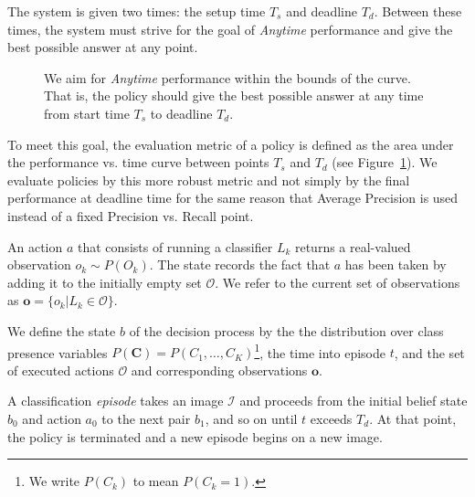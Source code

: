 \documentclass[runningheads]{llncs}
\begin{document}
The system is given two times: the setup time $T_s$ and deadline $T_d$.
Between these times, the system must strive for the goal of \emph{Anytime} performance and give the best possible answer at any point.

\begin{figure}[h!]
  \caption{We aim for \emph{Anytime} performance within the bounds of the curve. That is, the policy should give the best possible answer at any time from start time $T_s$ to deadline $T_d$.}
  \label{fig:evaluation}
\end{figure}

To meet this goal, the evaluation metric of a policy is defined as the area under the performance vs. time curve between points $T_s$ and $T_d$ (see Figure~\ref{fig:evaluation}).
We evaluate policies by this more robust metric and not simply by the final performance at deadline time for the same reason that Average Precision is used instead of a fixed Precision vs. Recall point.

An action $a$ that consists of running a classifier $L_k$ returns a real-valued observation $o_k \sim P(O_k)$.
The state records the fact that $a$ has been taken by adding it to the initially empty set $\mathcal{O}$.
We refer to the current set of observations as $\mathbf{o} = \{o_k | L_k \in \mathcal{O}\}$.

We define the state $b$ of the decision process by the the distribution over class presence variables $P(\mathbf{C}) = P(C_1, \dots, C_K)$\footnote{We write $P(C_k)$ to mean $P(C_k=1)$.}, the time into episode $t$, and the set of executed actions $\mathcal{O}$ and corresponding observations $\mathbf{o}$.

A classification \emph{episode} takes an image $\mathcal{I}$ and proceeds from the initial belief state $b_0$ and action $a_0$ to the next pair $b_1$, and so on until $t$ exceeds $T_d$.
At that point, the policy is terminated and a new episode begins on a new image.
\end{document}
